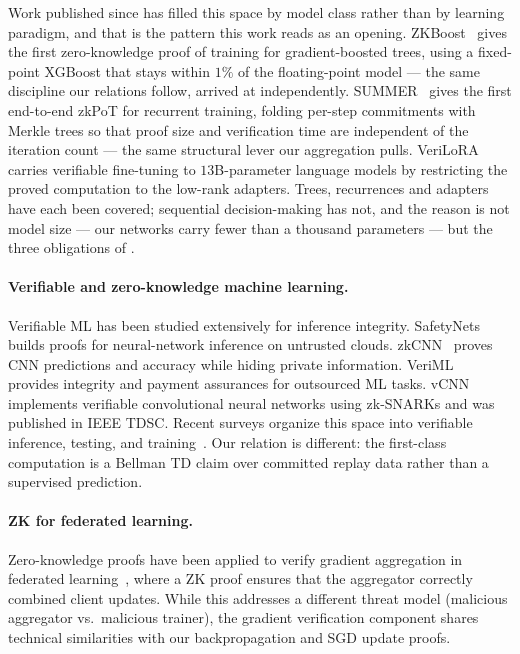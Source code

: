 Work published since has filled this space by model class rather than by
learning paradigm, and that is the pattern this work reads as an opening.
ZKBoost~\cite{zkboost2026} gives the first zero-knowledge proof of training for
gradient-boosted trees, using a fixed-point XGBoost that stays within $1\%$ of
the floating-point model --- the same discipline our relations follow, arrived
at independently. SUMMER~\cite{summer2026} gives the first end-to-end zkPoT for
recurrent training, folding per-step commitments with Merkle trees so that
proof size and verification time are independent of the iteration count --- the
same structural lever our aggregation pulls. VeriLoRA~\cite{verilora2026}
carries verifiable fine-tuning to $13$B-parameter language models by
restricting the proved computation to the low-rank adapters. Trees, recurrences
and adapters have each been covered; sequential decision-making has not, and
the reason is not model size --- our networks carry fewer than a thousand
parameters --- but the three obligations of .

\paragraph{Verifiable and zero-knowledge machine learning.}
Verifiable ML has been studied extensively for inference integrity.
SafetyNets~\cite{safetynets2017} builds proofs for neural-network inference on
untrusted clouds. zkCNN~\cite{zkcnn2021} proves CNN predictions and accuracy
while hiding private information. VeriML~\cite{veriml2021} provides integrity
and payment assurances for outsourced ML tasks. vCNN~\cite{vcnn2024} implements
verifiable convolutional neural networks using zk-SNARKs and was published in
IEEE TDSC. Recent surveys organize this space into verifiable inference,
testing, and training~\cite{zkmlsurvey2026}. Our relation is different: the
first-class computation is a Bellman TD claim over committed replay data rather
than a supervised prediction.

\paragraph{ZK for federated learning.}
Zero-knowledge proofs have been applied to verify gradient aggregation in
federated learning~\cite{zkgradient2025}, where a ZK proof ensures that the
aggregator correctly combined client updates. While this addresses a different
threat model (malicious aggregator vs.\ malicious trainer), the gradient
verification component shares technical similarities with our backpropagation
and SGD update proofs.

